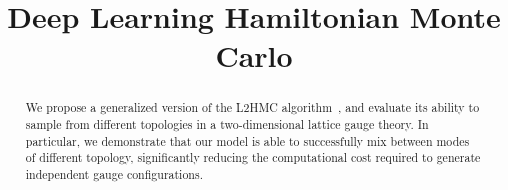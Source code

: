 \documentclass{article} %
\title{Deep Learning Hamiltonian Monte Carlo}
\author{Sam Foreman, Xiao-Yong Jin\& James Osborn\thanks{\hyperref{%
      https://github.com/saforem2/l2hmc-qcd
   }{https://github.com/saforem2/l2hmc-qcd} \\
   Leadership Computing Facility\\
   Argonne National Laboratory\\
   Lemont, IL 60439
   \texttt{\{foremans,xjin,\}@anl.gov},%
   \texttt{\{osborn\}@alcf.anl.gov}\\
}}
\begin{document}
\maketitle

\begin{abstract}
   We propose a generalized version of the L2HMC algorithm~\citep{levy2017}, and evaluate its ability to sample from
   different topologies in a two-dimensional lattice gauge theory.
   In particular, we demonstrate that our model is able to successfully mix between modes of different topology,
   significantly reducing the computational cost required to generate independent gauge configurations.
\end{abstract}

\end{document}
